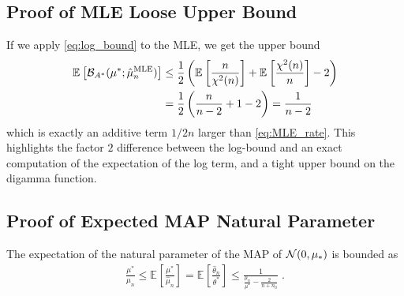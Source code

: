 \documentclass{article}
\newcommand*{\expect}[2][]{\ensuremath{\mathbb{E}_{#1} \left[ #2 \right] }} %
\newcommand{\logpart}{A}
\newcommand{\bregmanconj}{\cB_{\logpart^*}}
\newcommand{\natp}{\theta}
\newcommand{\MAPm}{\hat \mu_n}
\newcommand{\MAPt}{\hat \natp_n}
\begin{document}
	
\subsection{Proof of MLE Loose Upper Bound}
If we apply \eqref{eq:log_bound} to the MLE, we get the upper bound
\begin{align}
	\expect{\bregmanconj(\mu^*; \MAPm^\text{MLE})}
	&\leq  \half \left( \expect{\frac{n}{\chi^2(n)}} + \expect{\frac{\chi^2(n)}{n}} - 2 \right ) \\
	&= \half \left( \frac{n}{n-2} + 1 - 2 \right)  
	= \frac{1}{n-2}
\end{align}
which is exactly  an additive term $1/2n$ larger than \eqref{eq:MLE_rate}. This highlights the factor $2$ difference between the log-bound and an exact computation of the expectation of the log term, and a tight upper bound on the digamma function.

\subsection{Proof of Expected MAP Natural Parameter}
\begin{lemma}
	The expectation of the natural parameter of the MAP of ${\mathcal N}(0,\mu_*)$ is bounded as
	\begin{align}
		\frac{\mu^*}{\mu_n}
		\leq \expect{\frac{\mu^*}{\MAPm}} 
		= \expect{\frac{\MAPt}{\natp^*}} 
		\leq \frac{1}{\frac{\mu_n}{\mu^*} - \frac{2}{n+n_0}} \; .
	\end{align}
\end{lemma}
\end{document}
